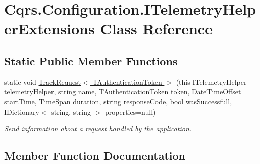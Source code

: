 \hypertarget{classCqrs_1_1Configuration_1_1ITelemetryHelperExtensions}{}\section{Cqrs.\+Configuration.\+I\+Telemetry\+Helper\+Extensions Class Reference}
\label{classCqrs_1_1Configuration_1_1ITelemetryHelperExtensions}
\subsection*{Static Public Member Functions}
\begin{DoxyCompactItemize}
\item 
static void \hyperlink{classCqrs_1_1Configuration_1_1ITelemetryHelperExtensions_a2e4bf3f56dbd0d10acac587499aca7ba}{Track\+Request$<$ T\+Authentication\+Token $>$} (this I\+Telemetry\+Helper telemetry\+Helper, string name, T\+Authentication\+Token token, Date\+Time\+Offset start\+Time, Time\+Span duration, string response\+Code, bool was\+Successfull, I\+Dictionary$<$ string, string $>$ properties=null)
\begin{DoxyCompactList}\small\item\em Send information about a request handled by the application. \end{DoxyCompactList}\end{DoxyCompactItemize}


\subsection{Member Function Documentation}
\mbox{\label{classCqrs_1_1Configuration_1_1ITelemetryHelperExtensions_a2e4bf3f56dbd0d10acac587499aca7ba}} 
